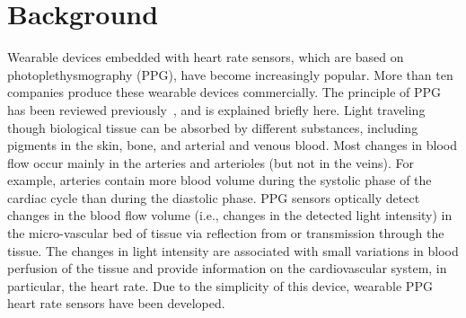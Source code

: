 \documentclass[11pt, draftclsnofoot, onecolumn]{IEEEtran}
\begin{document}
	
	
    \pagebreak
	\section{Background} \label{sec:Background} %
	Wearable devices embedded with heart rate sensors, which are based on photoplethysmography (PPG), have become increasingly popular. More than ten companies produce these wearable devices commercially. The principle of PPG has been reviewed previously~\cite{tamura2014wearable}, and is explained briefly here. Light traveling though biological tissue can be absorbed by different substances, including pigments in the skin, bone, and arterial and venous blood. Most changes in blood flow occur mainly in the arteries and arterioles (but not in the veins). For example, arteries contain more blood volume during the systolic phase of the cardiac cycle than during the diastolic phase. PPG sensors optically detect changes in the blood flow volume (i.e., changes in the detected light intensity) in the micro-vascular bed of tissue via reflection from or transmission through the tissue. The changes in light intensity are associated with small variations in blood perfusion of the tissue and provide information on the cardiovascular system, in particular, the heart rate. Due to the simplicity of this device, wearable PPG heart rate sensors have been developed.
    
\end{document}
